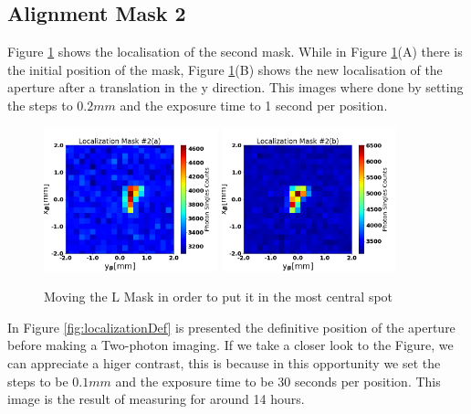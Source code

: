 \subsection{Alignment Mask 2}
Figure \ref{fig:localizationL} shows the localisation of the second mask. While in Figure \ref{fig:localizationL}(A)
there is the initial position of the mask, Figure \ref{fig:localizationL}(B) shows
the new localisation of the aperture after a translation in the y direction. This images
where done by setting the steps to $0.2mm$ and the exposure time to 1 second per position.


\begin{figure}[h!]
\centering
{  \includegraphics[width=0.45\textwidth]{Figures/localizationL1.png} }
{  \includegraphics[width=0.45\textwidth]{Figures/localizationL2.png} }
\caption{Moving the L Mask in order to put it in the most central spot}
 \label{fig:localizationL}
\end{figure}
In Figure \ref{fig:localizationDef} is presented the definitive position of the aperture
before making a Two-photon imaging. If we take a closer look to the Figure, we can appreciate
a higer contrast, this is because in this opportunity we set the steps to be $0.1mm$ and 
the exposure time to be 30 seconds per position. This image is the result of measuring for around 
14 hours.
